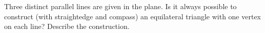 Three distinct parallel lines are given in the plane. Is it always possible to construct (with straightedge and compass) an equilateral triangle with one vertex on each line? Describe the construction.
